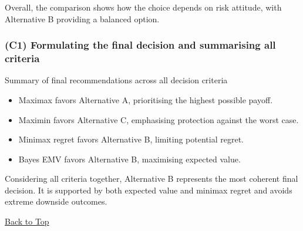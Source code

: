 Overall, the comparison shows how the choice depends on risk attitude, with Alternative B providing a balanced option.

\subsubsection{(C1) Formulating the final decision and summarising all criteria}\label{subsubsec:example1-1-c1}

Summary of final recommendations across all decision criteria

\begin{itemize}
	\item Maximax favors Alternative A, prioritising the highest possible payoff.
	\item Maximin favors Alternative C, emphasising protection against the worst case.
	\item Minimax regret favors Alternative B, limiting potential regret.
	\item Bayes EMV favors Alternative B, maximising expected value.
\end{itemize}

Considering all criteria together, Alternative B represents the most coherent final decision. It is supported by both expected value and minimax regret and avoids extreme downside outcomes.

\vspace{6pt}
\noindent\hyperref[table-of-contents]{Back to Top}
